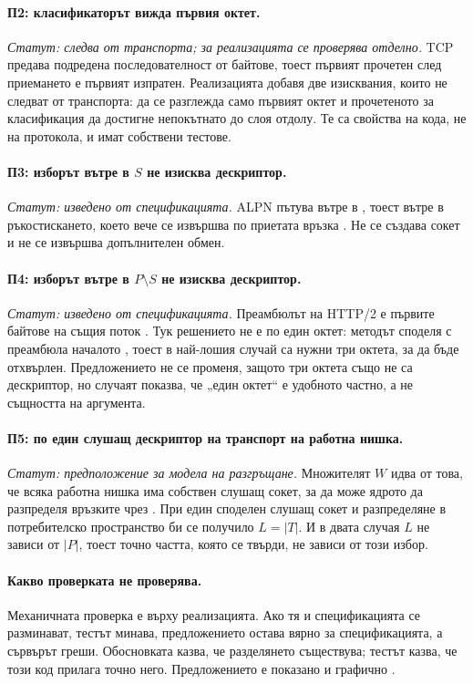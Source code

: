 \paragraph{П2: класификаторът вижда първия октет.} \emph{Статут: следва от транспорта; за
реализацията се проверява отделно.} TCP предава подредена последователност от байтове, тоест
първият прочетен след приемането е първият изпратен. Реализацията добавя две изисквания,
които не следват от транспорта: да се разглежда само първият октет и прочетеното за
класификация да достигне непокътнато до слоя отдолу. Те са свойства на кода, не на протокола,
и имат собствени тестове.

\paragraph{П3: изборът вътре в \(S\) не изисква дескриптор.} \emph{Статут: изведено от
спецификацията.} ALPN пътува вътре в , тоест вътре в ръкостискането, което
вече се извършва по приетата връзка \cite{rfc7301}. Не се създава сокет и не се извършва
допълнителен обмен.

\paragraph{П4: изборът вътре в \(P \setminus S\) не изисква дескриптор.} \emph{Статут:
изведено от спецификацията.} Преамбюлът на HTTP/2 е първите байтове на същия поток
\cite{rfc9113}. Тук решението не е по един октет: методът  споделя с преамбюла
началото , тоест в най-лошия случай са нужни три октета, за да бъде отхвърлен.
Предложението не се променя, защото три октета също не са дескриптор, но случаят показва, че
„един октет“ е удобното частно, а не същността на аргумента.

\paragraph{П5: по един слушащ дескриптор на транспорт на работна нишка.} \emph{Статут:
предположение за модела на разгръщане.} Множителят \(W\) идва от това, че всяка работна нишка
има собствен слушащ сокет, за да може ядрото да разпределя връзките чрез
. При един споделен слушащ сокет и разпределяне в потребителско
пространство би се получило \(L = |T|\). И в двата случая \(L\) не зависи от \(|P|\), тоест
точно частта, която се твърди, не зависи от този избор.

\paragraph{Какво проверката не проверява.} Механичната проверка е върху реализацията. Ако тя
и спецификацията се разминават, тестът минава, предложението остава вярно за спецификацията,
а сървърът греши. Обосновката казва, че разделянето съществува; тестът казва, че този код
прилага точно него. Предложението е показано и графично .

